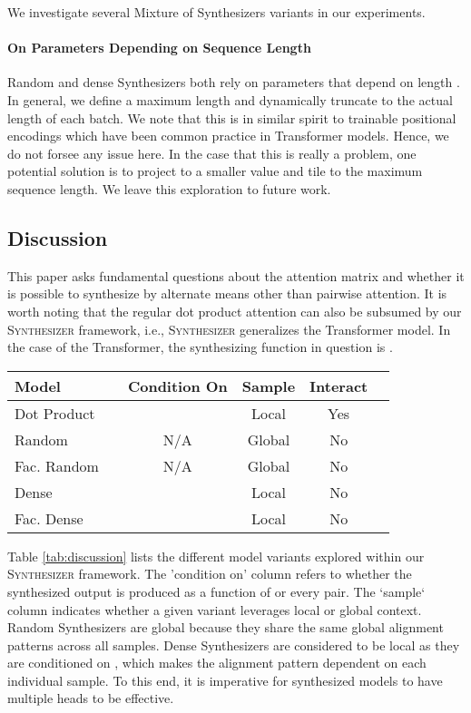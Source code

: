 \documentclass{article}
\begin{document}
We investigate several Mixture of Synthesizers variants in our experiments.
\paragraph{On Parameters Depending on Sequence Length}
Random and dense Synthesizers both rely on parameters that depend on length . In general, we define a maximum length and dynamically truncate to the actual length of each batch. We note that this is in similar spirit to trainable positional encodings which have been common practice in Transformer models. Hence, we do not forsee any issue here. In the case that this is really a problem, one potential solution is to project to a smaller value  and tile  to the maximum sequence length. We leave this exploration to future work.

\subsection{Discussion}
This paper asks fundamental questions about the attention matrix  and whether it is possible to synthesize  by alternate means other than pairwise attention. It is worth noting that the regular dot product attention can also be subsumed by our \textsc{Synthesizer} framework, i.e., \textsc{Synthesizer} generalizes the Transformer model. In the case of the Transformer, the synthesizing function in question is .  
\begin{table*}

\small
    \centering
    \begin{tabular}{l|ccccc}
    \toprule
    \midrule
        Model &   & Condition On & Sample & Interact & \\
        \midrule
        Dot Product &  &  & Local & Yes &  \\
        \midrule
        Random &  & N/A & Global & No & \\
        Fac. Random &  &  N/A & Global & No & \\
         Dense &  &  & Local & No & \\
          Fac. Dense &  &  & Local & No & \\
         \bottomrule
    \end{tabular}
    \caption{Overview of all Synthesizing Functions.}
    \label{tab:discussion}
\end{table*}
Table \ref{tab:discussion} lists the different model variants explored within our \textsc{Synthesizer} framework. The 'condition on' column refers to whether the synthesized output is produced as a function of  or every  pair. The `sample` column indicates whether a given variant leverages local or global context. Random Synthesizers are global because they share the same global alignment patterns across all samples. Dense Synthesizers are considered to be local as they are conditioned on , which makes the alignment pattern dependent on each individual sample. To this end, it is imperative for synthesized models to have multiple heads to be effective. 
\end{document}
